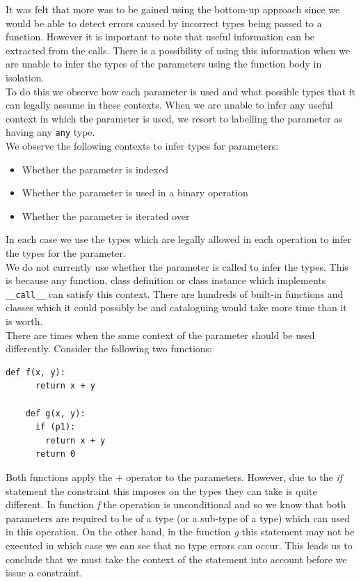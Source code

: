\documentclass[12pt, titlepage]{article}
\begin{document}
It was felt that more was to be gained using the bottom-up approach since we would be able to detect errors caused by incorrect types being passed to a function. However it is important to note that useful information can be extracted from the calls. There is a possibility of using this information when we are unable to infer the types of the parameters using the function body in isolation. \\
\indent To do this we observe how each parameter is used and what possible types that it can legally assume in these contexts. When we are unable to infer any useful context in which the parameter is used, we resort to labelling the parameter as having any \texttt{any} type. \\
\indent We observe the following contexts to infer types for parameters:
\begin{itemize}
	\item Whether the parameter is indexed
	\item Whether the parameter is used in a binary operation
	\item Whether the parameter is iterated over
\end{itemize}
In each case we use the types which are legally allowed in each operation to infer the types for the parameter. \\
\indent We do not currently use whether the parameter is called to infer the types. This is because any function, class definition or class instance which implements \texttt{\_\_call\_\_} can satisfy this context. There are hundreds of built-in functions and classes which it could possibly be and cataloguing would take more time than it is worth. \\
\indent There are times when the same context of the parameter should be used differently. Consider the following two functions:
\begin{lstlisting}[mathescape]
	def f(x, y):
	  return x + y
		
	def g(x, y):
	  if (p1):
	    return x + y
	  return 0
\end{lstlisting}
Both functions apply the $+$ operator to the parameters. However, due to the \textit{if} statement the constraint this imposes on the types they can take is quite different. In function \textit{f} the operation is unconditional and so we know that both parameters are required to be of a type (or a sub-type of a type) which can used in this operation. On the other hand, in the function \textit{g} this statement may not be executed in which case we can see that no type errors can occur. This leads us to conclude that we must take the context of the statement into account before we issue a constraint.
\end{document}
